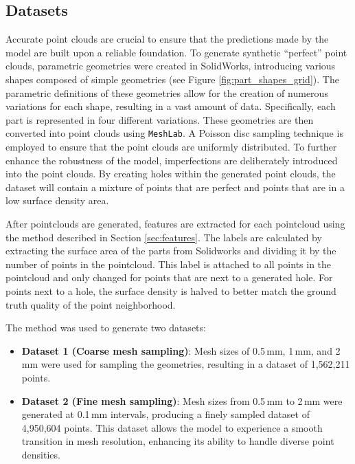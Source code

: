 \subsection{Datasets}
Accurate point clouds are crucial to ensure that the predictions made by the model are built upon a reliable foundation. To generate synthetic “perfect” point clouds, parametric geometries were created in SolidWorks, introducing various shapes composed of simple geometries (see Figure \ref{fig:part_shapes_grid}). The parametric definitions of these geometries allow for the creation of numerous variations for each shape, resulting in a vast amount of data. Specifically, each part is represented in four different variations. These geometries are then converted into point clouds using \texttt{MeshLab}. A Poisson disc sampling technique is employed to ensure that the point clouds are uniformly distributed. To further enhance the robustness of the model, imperfections are deliberately introduced into the point clouds. By creating holes within the generated point clouds, the dataset will contain a mixture of points that are perfect and points that are in a low surface density area. 

After pointclouds are generated, features are extracted for each pointcloud using the method described in Section \ref{sec:features}. The labels are calculated by extracting the surface area of the parts from Solidworks and dividing it by the number of points in the pointcloud. This label is attached to all points in the pointcloud and only changed for points that are next to a generated hole. For points next to a hole, the surface density is halved to better match the ground truth quality of the point neighborhood.

The method was used to generate two datasets:
\begin{itemize}
    \item \textbf{Dataset 1 (Coarse mesh sampling)}: Mesh sizes of 0.5\,mm, 1\,mm, and 2\,mm were used for sampling the geometries, resulting in a dataset of 1,562,211 points.
    
    \item \textbf{Dataset 2 (Fine mesh sampling)}: Mesh sizes from 0.5\,mm to 2\,mm were generated at 0.1\,mm intervals, producing a finely sampled dataset of 4,950,604 points. This dataset allows the model to experience a smooth transition in mesh resolution, enhancing its ability to handle diverse point densities.
\end{itemize}


